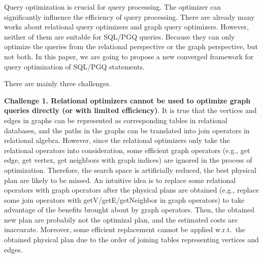 Query optimization is crucial for query processing.
The optimizer can significantly influence the efficiency of query processing.
There are already many works about relational query optimizers and graph query optimizers.
However, neither of them are suitable for SQL/PGQ queries.
Because they can only optimize the queries from the relational perspective or the graph perspective, but not both.
In this paper, we are going to propose a new converged framework for query optimization of SQL/PGQ statements.

There are mainly three challenges.

\textbf{Challenge 1. Relational optimizers cannot be used to optimize graph queries directly (or with limited efficiency)}.
It is true that the vertices and edges in graphs can be represented as corresponding tables in relational databases, and the paths in the graphs can be translated into join operators in relational algebra.
However, since the relational optimizers only take the relational operators into consideration, some efficient graph operators (e.g., get edge, get vertex, get neighbors with graph indices) are ignored in the process of optimization.
Therefore, the search space is artificially reduced, the best physical plan are likely to be missed.
An intuitive idea is to replace some relational operators with graph operators after the physical plans are obtained (e.g., replace some join operators with getV/getE/getNeighbor in graph operators) to take advantage of the benefits brought about by graph operators.
Then, the obtained new plan are probabily not the optimizal plan, and the estimated costs are inaccurate.
Moreover, some efficient replacement cannot be applied w.r.t.~the obtained physical plan due to the order of joining tables representing vertices and edges.

